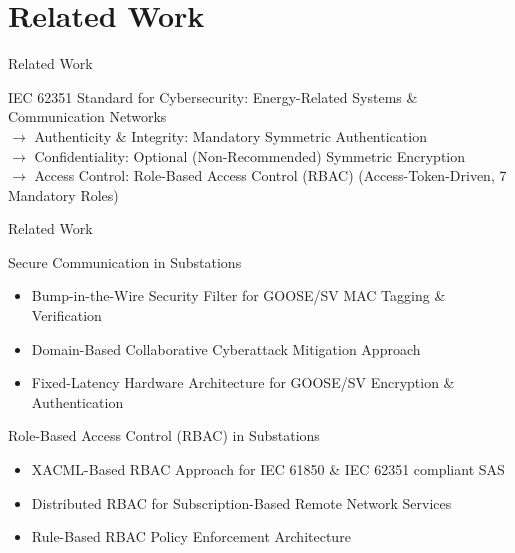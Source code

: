 \documentclass[en]{sdqbeamer}
\begin{document}
\section{Related Work}
\begin{frame}{Related Work}
    \begin{blueblock}{IEC 62351 \parencite*{IEC62351P6,IEC62351P8}}
        Standard for Cybersecurity: Energy-Related Systems \& Communication Networks
        \\$\rightarrow$ Authenticity \& Integrity: Mandatory Symmetric Authentication
        \\$\rightarrow$ Confidentiality: Optional (Non-Recommended) Symmetric Encryption
        \\$\rightarrow$ Access Control: Role-Based Access Control (RBAC) (Access-Token-Driven, 7 Mandatory Roles)
    \end{blueblock}
\end{frame}
\begin{frame}{Related Work}
    \begin{blueblock}{Secure Communication in Substations}
        \begin{itemize}
            \item Bump-in-the-Wire Security Filter for GOOSE/SV MAC Tagging \& Verification \parencite{Ishchenko2018}
            \item Domain-Based Collaborative Cyberattack Mitigation Approach \parencite{Hong2019}
            \item Fixed-Latency Hardware Architecture for GOOSE/SV Encryption \& Authentication \parencite{Rodriguez2021}
        \end{itemize}
    \end{blueblock}

    \begin{blueblock}{Role-Based Access Control (RBAC) in Substations}
        \begin{itemize}
            \item XACML-Based RBAC Approach for IEC 61850 \& IEC 62351 compliant SAS \parencite{Lee2015}
            \item Distributed RBAC for Subscription-Based Remote Network Services \parencite{Ma2006} %
            \item Rule-Based RBAC Policy Enforcement Architecture \parencite{Alcaraz2016} %
        \end{itemize}
    \end{blueblock}
\end{frame}
\end{document}
